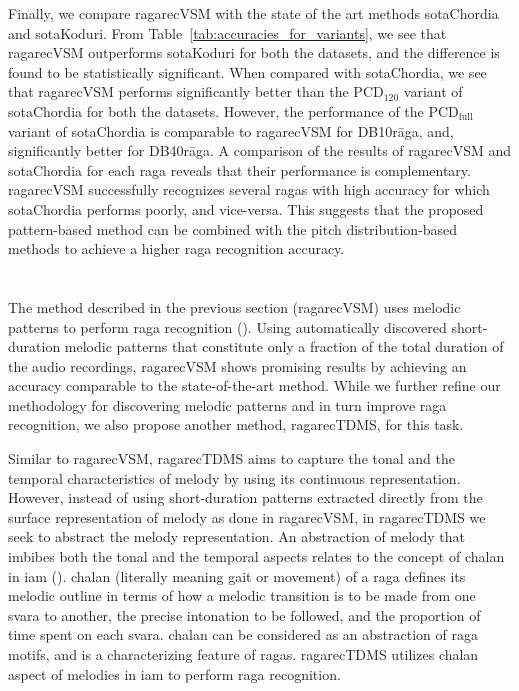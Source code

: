 Finally, we compare \acrshort{ragarecVSM} with the state of the art methods \acrshort{sotaChordia} and \acrshort{sotaKoduri}. From Table~\ref{tab:accuracies_for_variants}, we see that \acrshort{ragarecVSM} outperforms \acrshort{sotaKoduri} for both the datasets, and the difference is found to be statistically significant. When compared with \acrshort{sotaChordia}, we see that \acrshort{ragarecVSM} performs significantly better than the $\mathrm{PCD}_{120}$ variant of \acrshort{sotaChordia} for both the datasets. However, the performance of the $\mathrm{PCD}_\mathrm{full}$ variant of \acrshort{sotaChordia} is comparable to \acrshort{ragarecVSM} for DB10r\={a}ga, and, significantly better for DB40r\={a}ga. A comparison of the results of \acrshort{ragarecVSM} and \acrshort{sotaChordia} for each \gls{raga} reveals that their performance is complementary. \acrshort{ragarecVSM} successfully recognizes several \glspl{raga} with high accuracy for which \acrshort{sotaChordia} performs poorly, and vice-versa. This suggests that the proposed pattern-based method can be combined with the pitch distribution-based methods to achieve a higher \gls{raga} recognition accuracy.



\section{}
\label{sec:tdms_raga_recognition}

The method described in the previous section (\acrshort{ragarecVSM}) uses melodic patterns to perform \gls{raga} recognition (). Using automatically discovered short-duration melodic patterns that constitute only a fraction of the total duration of the audio recordings, \acrshort{ragarecVSM} shows promising results by achieving an accuracy comparable to the state-of-the-art method. While we further refine our methodology for discovering melodic patterns and in turn improve \gls{raga} recognition, we also propose another method, \acrshort{ragarecTDMS}, for this task. 

Similar to \acrshort{ragarecVSM}, \acrshort{ragarecTDMS} aims to capture the tonal and the temporal characteristics of melody by using its continuous representation. However, instead of using short-duration patterns extracted directly from the surface representation of melody as done in \acrshort{ragarecVSM}, in \acrshort{ragarecTDMS} we seek to abstract the melody representation. An abstraction of melody that imbibes both the tonal and the temporal aspects relates to the concept of \gls{chalan} in \gls{iam} (). \Gls{chalan} (literally meaning gait or movement) of a \gls{raga} defines its melodic outline in terms of how a melodic transition is to be made from one \gls{svara} to another, the precise intonation to be followed, and the proportion of time spent on each \gls{svara}. \Gls{chalan} can be considered as an abstraction of \gls{raga} motifs, and is a characterizing feature of \glspl{raga}. \acrshort{ragarecTDMS} utilizes \gls{chalan} aspect of melodies in \gls{iam} to perform \gls{raga} recognition.

